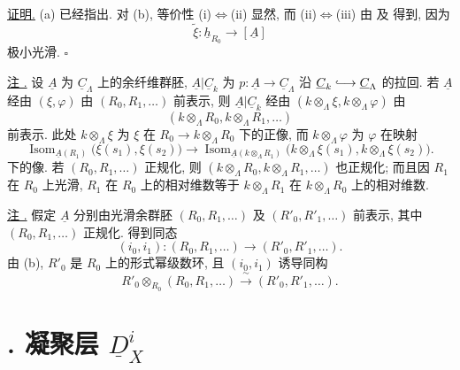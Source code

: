 \underline{证明.} (a) 已经指出.
对 (b), 等价性 (i)$\Leftrightarrow$(ii) 显然,
而 (ii)$\Leftrightarrow$(iii) 由  及
 得到, 因为
\[
 \widetilde\xi:\underline h_{R_0}\longrightarrow[\underline A]
\]
极小光滑. \hfill$\square$

\underline{注 .}
设 $\underline A$ 为 $\underline C_\Lambda$ 上的余纤维群胚,
$\underline A|\underline C_k$ 为
$p:\underline A\longrightarrow\underline C_\Lambda$ 沿
$\underline C_k\lhook\joinrel\longrightarrow\underline C_\Lambda$ 的拉回.
若 $\underline A$ 经由 $(\xi,\varphi)$ 由 $(R_0,R_1,\ldots)$ 前表示,
则 $\underline A|\underline C_k$ 经由
$(k\otimes_\Lambda\xi,k\otimes_\Lambda\varphi)$ 由
\[
 (k\otimes_\Lambda R_0,k\otimes_\Lambda R_1,\ldots)
\]
前表示. 此处 $k\otimes_\Lambda\xi$ 为 $\xi$ 在
$R_0\longrightarrow k\otimes_\Lambda R_0$ 下的正像,
而 $k\otimes_\Lambda\varphi$ 为 $\varphi$ 在映射
\[
 \operatorname{Isom}_{\underline A(R_1)}
   \bigl(\xi(s_1),\xi(s_2)\bigr)
 \longrightarrow
 \operatorname{Isom}_{\underline A(k\otimes_\Lambda R_1)}
   \bigl(k\otimes_\Lambda\xi(s_1),
         k\otimes_\Lambda\xi(s_2)\bigr).
\]
下的像. 若 $(R_0,R_1,\ldots)$ 正规化,
则 $(k\otimes_\Lambda R_0,k\otimes_\Lambda R_1,\ldots)$ 也正规化;
而且因 $R_1$ 在 $R_0$ 上光滑, $R_1$ 在 $R_0$ 上的相对维数等于
$k\otimes_\Lambda R_1$ 在 $k\otimes_\Lambda R_0$ 上的相对维数.

\underline{注 .}
假定 $\underline A$ 分别由光滑余群胚 $(R_0,R_1,\ldots)$ 及
$(R'_0,R'_1,\ldots)$ 前表示, 其中 $(R_0,R_1,\ldots)$ 正规化.
得到同态
\[
 (i_0,i_1):(R_0,R_1,\ldots)\longrightarrow(R'_0,R'_1,\ldots).
\]
由 (b),
$R'_0$ 是 $R_0$ 上的形式幂级数环,
且 $(i_0,i_1)$ 诱导同构
\[
 R'_0\otimes_{R_0}(R_0,R_1,\ldots)
 \xrightarrow{\ \sim\ }(R'_0,R'_1,\ldots).
\]


\section*{. 凝聚层 $\underline D_X^i$}

